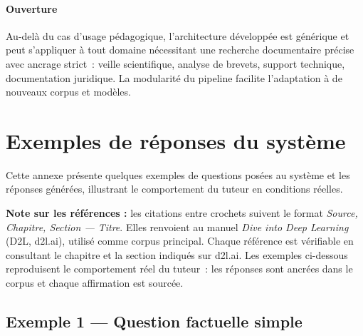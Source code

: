 \documentclass[11pt,a4paper]{article}
\begin{document}
\paragraph{Ouverture}

Au-delà du cas d'usage pédagogique, l'architecture développée est générique et peut s'appliquer à tout domaine nécessitant une recherche documentaire précise avec ancrage strict~: veille scientifique, analyse de brevets, support technique, documentation juridique. La modularité du pipeline facilite l'adaptation à de nouveaux corpus et modèles.

\appendix
\section{Exemples de réponses du système}
\label{app:exemples}

Cette annexe présente quelques exemples de questions posées au système et les réponses générées, illustrant le comportement du tuteur en conditions réelles.

\smallskip
{\footnotesize\textbf{Note sur les références :} les citations entre crochets suivent le format \textit{Source, Chapitre, Section --- Titre}. Elles renvoient au manuel \textit{Dive into Deep Learning} (D2L, d2l.ai), utilisé comme corpus principal. Chaque référence est vérifiable en consultant le chapitre et la section indiqués sur d2l.ai. Les exemples ci-dessous reproduisent le comportement réel du tuteur~: les réponses sont ancrées dans le corpus et chaque affirmation est sourcée.}

\subsection*{Exemple 1 --- Question factuelle simple}
\end{document}
